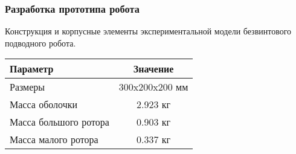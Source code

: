 \begin{frame}
\frametitle{Разработка прототипа робота}

Конструкция и корпусные элементы экспериментальной модели безвинтового подводного робота.

\begin{minipage}[ht]{0.33\linewidth}
	\vspace{-27mm}
	\vspace{3mm}
\end{minipage}
\hfill
\begin{minipage}[t]{0.63\linewidth}
	
	\begin{table}
		\centering
		{\begin{tabular}{@{}lc@{}}\hline
				Параметр & Значение \\
				\hline
				Размеры & 300x200x200 мм \\
				Масса оболочки  & 2.923 кг \\
				Масса большого ротора & 0.903 кг \\
				Масса малого ротора & 0.337 кг \\				
				\hline
			\end{tabular}
		}
	\end{table}
\end{minipage}

\end{frame}




